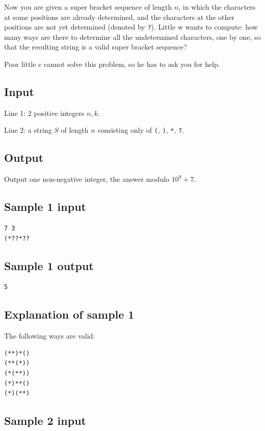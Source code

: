 \documentclass[11pt]{article}
\begin{document}
Now you are given a super bracket sequence of length $n$, in which the
characters at some positions are already determined, and the characters at
the other positions are not yet determined (denoted by \texttt{?}).
Little w wants to compute:
how many ways are there to determine all the undetermined characters, one
by one, so that the resulting string is a valid super bracket sequence?

Poor little c cannot solve this problem, so he has to ask you for help.

\subsection*{Input}

Line 1: 2 positive integers $n, k$.

Line 2: a string $S$ of length $n$ consisting only of
\texttt{(}, \texttt{)}, \texttt{*}, \texttt{?}.

\subsection*{Output}

Output one non-negative integer, the answer modulo $10^9 + 7$.

\subsection*{Sample 1 input}

\begin{verbatim}
7 3
(*??*??
\end{verbatim}

\subsection*{Sample 1 output}

\begin{verbatim}
5
\end{verbatim}

\subsection*{Explanation of sample 1}

The following ways are valid:
\begin{verbatim}
(**)*()
(**(*))
(*(**))
(*)**()
(*)(**)
\end{verbatim}

\subsection*{Sample 2 input}
\end{document}
